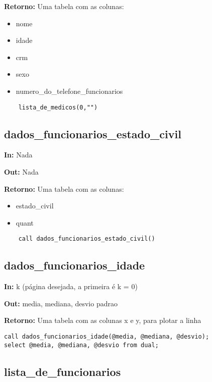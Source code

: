 \textbf{Retorno:} Uma tabela com as colunas:

\begin{itemize}
	\item nome
	\item idade
	\item crm
	\item sexo
	\item numero\_do\_telefone\_funcionarios
\end{itemize}

\begin{verbatim}
	lista_de_medicos(0,"")
\end{verbatim}

\subsection{dados\_funcionarios\_estado\_civil}


\textbf{In:} Nada

\textbf{Out:} Nada

\textbf{Retorno:} Uma tabela com as colunas:

\begin{itemize}
	\item estado\_civil
	\item quant
\end{itemize}

\begin{verbatim}
	call dados_funcionarios_estado_civil()
\end{verbatim}

\subsection{dados\_funcionarios\_idade}


\textbf{In:} k (página desejada, a primeira é k = 0)

\textbf{Out:} media, mediana, desvio padrao

\textbf{Retorno:} Uma tabela com as colunas x e y, para plotar a linha

\begin{verbatim}
call dados_funcionarios_idade(@media, @mediana, @desvio);
select @media, @mediana, @desvio from dual;
\end{verbatim}


\subsection{lista\_de\_funcionarios}


